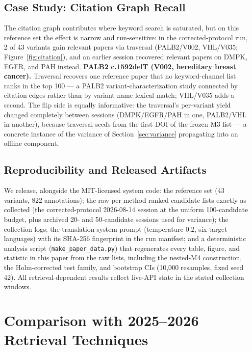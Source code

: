\documentclass[sigconf,screen]{acmart}
\begin{document}
\subsection{Case Study: Citation Graph Recall}
\label{sec:casestudy}

The citation graph contributes where keyword search is saturated, but on
this reference set the effect is narrow and run-sensitive: in the
corrected-protocol run, 2 of 43 variants gain relevant papers via
traversal (PALB2/V002, VHL/V035; Figure~\ref{fig:citation}), and an
earlier session recovered relevant papers on DMPK, EGFR, and PAH instead.
\textbf{PALB2 c.1592delT (V002, hereditary breast cancer).} Traversal
recovers one reference paper that no keyword-channel list ranks in the
top 100 --- a PALB2 variant-characterization study connected by citation
edges rather than by variant-name lexical match; VHL/V035 adds a second.
The flip side is equally informative: the traversal's per-variant yield
changed completely between sessions (DMPK/EGFR/PAH in one, PALB2/VHL in
another), because traversal seeds from the first DOI of the frozen M3
list --- a concrete instance of the variance of
Section~\ref{sec:variance} propagating into an offline component.



\subsection{Reproducibility and Released Artifacts}
\label{sec:repro}

We release, alongside the MIT-licensed system code: the reference set
(43 variants, 822 annotations); the raw per-method ranked candidate lists
exactly as collected (the corrected-protocol 2026-08-14 session at the
uniform 100-candidate budget, plus archived 20- and 50-candidate sessions
used for variance); the collection logs; the translation system prompt
(temperature 0.2, six target languages) with its SHA-256 fingerprint in
the run manifest; and a deterministic analysis script
(\texttt{make\_paper\_data.py}) that regenerates every table, figure, and
statistic in this paper from the raw lists, including the nested-M4
construction, the Holm-corrected test family, and bootstrap CIs (10{,}000
resamples, fixed seed 42). All retrieval-dependent results reflect
live-API state in the stated collection windows.

\section{Comparison with 2025--2026 Retrieval Techniques}
\label{sec:sota}
\end{document}

